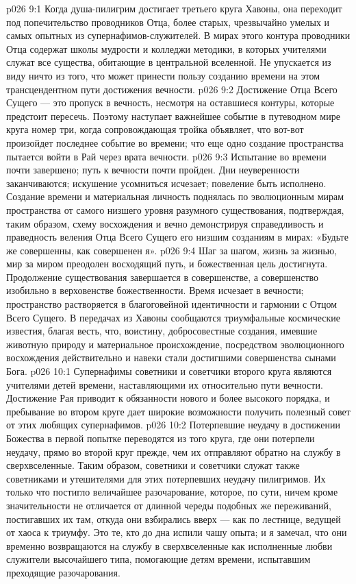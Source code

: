 \vs p026 9:1 Когда душа\hyp{}пилигрим достигает третьего круга Хавоны, она переходит под попечительство проводников Отца, более старых, чрезвычайно умелых и самых опытных из супернафимов\hyp{}служителей. В мирах этого контура проводники Отца содержат школы мудрости и колледжи методики, в которых учителями служат все существа, обитающие в центральной вселенной. Не упускается из виду ничто из того, что может принести пользу созданию времени на этом трансцендентном пути достижения вечности.
\vs p026 9:2 Достижение Отца Всего Сущего --- это пропуск в вечность, несмотря на оставшиеся контуры, которые предстоит пересечь. Поэтому наступает важнейшее событие в путеводном мире круга номер три, когда сопровождающая тройка объявляет, что вот\hyp{}вот произойдет последнее событие во времени; что еще одно создание пространства пытается войти в Рай через врата вечности.
\vs p026 9:3 \pc Испытание во времени почти завершено; путь к вечности почти пройден. Дни неуверенности заканчиваются; искушение усомниться исчезает; повеление быть  исполнено. Создание времени и материальная личность поднялась по эволюционным мирам пространства от самого низшего уровня разумного существования, подтверждая, таким образом, схему восхождения и вечно демонстрируя справедливость и праведность веления Отца Всего Сущего его низшим созданиям в мирах: «Будьте же совершенны, как совершенен я».
\vs p026 9:4 Шаг за шагом, жизнь за жизнью, мир за миром преодолен восходящий путь, и божественная цель достигнута. Продолжение существования завершается в совершенстве, а совершенство изобильно в верховенстве божественности. Время исчезает в вечности; пространство растворяется в благоговейной идентичности и гармонии с Отцом Всего Сущего. В передачах из Хавоны сообщаются триумфальные космические известия, благая весть, что, воистину, добросовестные создания, имевшие животную природу и материальное происхождение, посредством эволюционного восхождения действительно и навеки стали достигшими совершенства сынами Бога.
\vs p026 10:1 Супернафимы советники и советчики второго круга являются учителями детей времени, наставляющими их относительно пути вечности. Достижение Рая приводит к обязанности нового и более высокого порядка, и пребывание во втором круге дает широкие возможности получить полезный совет от этих любящих супернафимов.
\vs p026 10:2 \pc Потерпевшие неудачу в достижении Божества в первой попытке переводятся из того круга, где они потерпели неудачу, прямо во второй круг прежде, чем их отправляют обратно на службу в сверхвселенные. Таким образом, советники и советчики служат также советниками и утешителями для этих потерпевших неудачу пилигримов. Их только что постигло величайшее разочарование, которое, по сути, ничем кроме значительности не отличается от длинной череды подобных же переживаний, постигавших их там, откуда они взбирались вверх --- как по лестнице, ведущей от хаоса к триумфу. Это те, кто до дна испили чашу опыта; и я замечал, что они временно возвращаются на службу в сверхвселенные как исполненные любви служители высочайшего типа, помогающие детям времени, испытавшим преходящие разочарования.
